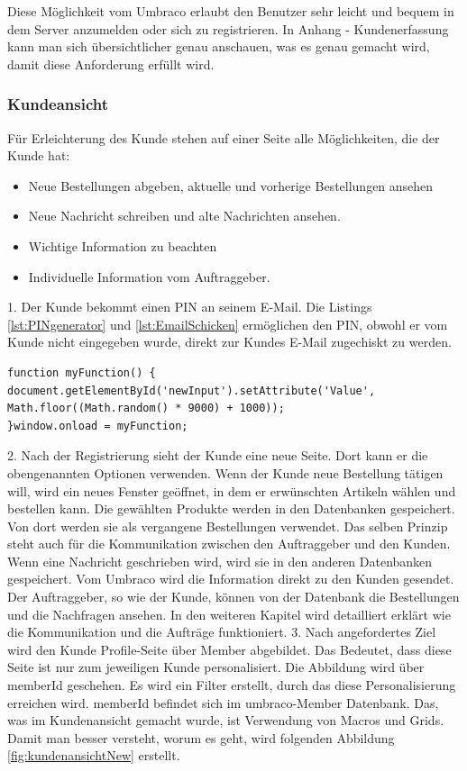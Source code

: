 Diese Möglichkeit vom Umbraco erlaubt den Benutzer sehr leicht und bequem in dem Server anzumelden oder sich zu registrieren.
In Anhang - Kundenerfassung kann man sich übersichtlicher genau anschauen, was es genau gemacht wird, damit diese Anforderung erfüllt wird.

\subsubsection{Kundeansicht}
Für Erleichterung des Kunde stehen auf einer Seite alle Möglichkeiten, die der Kunde hat: 

\begin{itemize}	
	\item Neue Bestellungen abgeben, aktuelle und vorherige Bestellungen ansehen
	\item Neue Nachricht schreiben und alte Nachrichten ansehen.
	\item Wichtige Information zu beachten
	\item Individuelle Information vom Auftraggeber.
\end{itemize}
1. Der Kunde bekommt einen PIN an seinem E-Mail. Die Listings \ref{lst:PINgenerator} und \ref{lst:EmailSchicken} ermöglichen den PIN, obwohl er vom Kunde nicht eingegeben wurde, direkt zur Kundes E-Mail zugechiskt zu werden.

\begin{lstlisting}[caption={JavaScript PIN Generator}, label=lst:PINgenerator]
function myFunction() {
document.getElementById('newInput').setAttribute('Value', Math.floor((Math.random() * 9000) + 1000));
}window.onload = myFunction;
\end{lstlisting}


2. Nach der Registrierung sieht der Kunde eine neue Seite. Dort kann er die obengenannten Optionen verwenden. 
Wenn der Kunde neue Bestellung tätigen will, wird ein neues Fenster geöffnet, in dem er erwünschten Artikeln wählen und bestellen kann. Die gewählten Produkte werden in den Datenbanken gespeichert. Von dort werden sie als vergangene Bestellungen verwendet. Das selben Prinzip steht auch für die Kommunikation zwischen den Auftraggeber und den Kunden. Wenn eine Nachricht geschrieben wird, wird sie in den anderen Datenbanken gespeichert. 
Vom Umbraco wird die Information direkt zu den Kunden gesendet. 
Der Auftraggeber, so wie der Kunde, können von der Datenbank die Bestellungen und die Nachfragen ansehen. In den weiteren Kapitel wird detailliert erklärt wie die Kommunikation und die Aufträge funktioniert.
3. Nach angefordertes Ziel wird den Kunde Profile-Seite über Member abgebildet. Das Bedeutet, dass diese Seite ist nur zum jeweiligen Kunde personalisiert. Die Abbildung wird über memberId geschehen. Es wird ein Filter erstellt, durch das diese Personalisierung erreichen wird. memberId befindet sich im umbraco-Member Datenbank.
Das, was im Kundenansicht gemacht wurde, ist Verwendung von Macros und Grids. 
Damit man besser versteht, worum es geht, wird folgenden Abbildung \ref{fig:kundenansichtNew} erstellt. 

